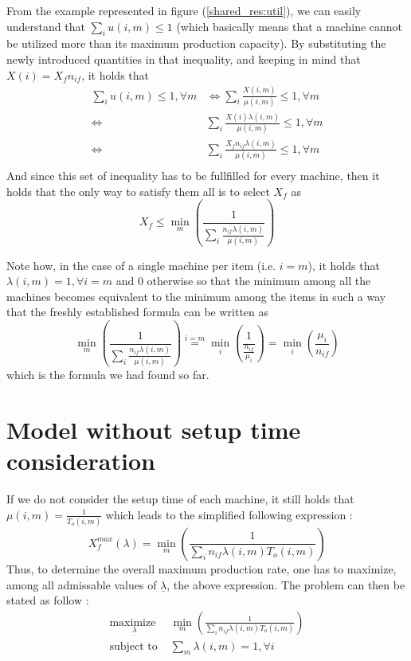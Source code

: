 From the example represented in figure (\ref{shared_res:util}), we can easily understand that $\sum_i u(i,m) \le 1$ (which basically means that a machine cannot be utilized more than its maximum production capacity). By substituting the newly introduced quantities in that inequality, and keeping in mind that $X(i) = X_fn_{if}$, it holds that
\[
    \begin{split}
        \sum_i u(i,m) \le 1, \forall m &\Leftrightarrow \sum_i\frac{X(i,m)}{\mu(i,m)} \le 1, \forall m\\
        \Leftrightarrow& \sum_i\frac{X(i)\lambda(i,m)}{\mu(i,m)} \le 1, \forall m\\
        \Leftrightarrow& \sum_i\frac{X_fn_{if}\lambda(i,m)}{\mu(i,m)} \le 1, \forall m\\
    \end{split}
\]
And since this set of inequality has to be fullfilled for every machine, then it holds that the only way to satisfy them all is to select $X_f$ as \begin{equation} X_f\le\min_m\left( \dfrac{1}{\sum_i\frac{n_{if}\lambda(i,m)}{\mu(i,m)}} \right) \label{shared_res:eqn_xfmax} \end{equation}

Note how, in the case of a single machine per item (i.e. $i=m$), it holds that $\lambda(i,m) = 1, \forall i=m$ and $0$ otherwise so that the minimum among all the machines becomes equivalent to the minimum among the items in such a way that the freshly established formula can be written as 
\[
    \min_m\left( \dfrac{1}{\sum_i\frac{n_{if}\lambda(i,m)}{\mu(i,m)}} \right) \overset{i=m}{=} \min_i\left( \dfrac{1}{ \frac{n_{if}}{\mu_i} } \right) = \min_i\left( \frac{\mu_i}{n_{if}} \right)
\] which is the formula we had found so far. 

\section{Model without setup time consideration}

If we do not consider the setup time of each machine, it still holds that $\mu(i,m) = \frac{1}{T_o(i,m)}$ which leads to the simplified following expression :
\begin{equation} X_f^{max}(\lambda) = \min_m\left( \frac{1}{ \sum_in_{if}\lambda(i,m)T_o(i,m) } \right) \label{shared_res:eqn_xf_wthout_setup} \end{equation} Thus, to determine the overall maximum production rate, one has to maximize, among all admissable values of $\underline\lambda$, the above expression. The problem can then be stated as follow : 
\[
    \begin{split}
        \underset{\underline\lambda}{\textrm{maximize }}& \min_m\left( \frac{1}{\sum_in_{if}\lambda(i,m)T_o(i,m)} \right)\\
        \textrm{subject to }& \sum_m \lambda(i,m) = 1, \forall i
    \end{split}
\]

